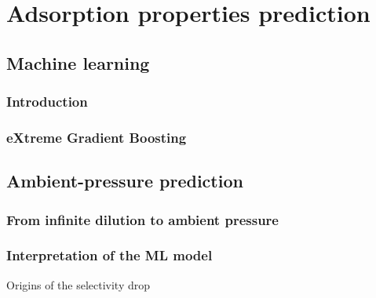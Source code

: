 \documentclass[main]{subfiles}
\begin{document}
\chapter{Adsorption properties prediction}
\vspace*{-1\baselineskip}

\section{Machine learning}

\subsection{Introduction}

\subsection{eXtreme Gradient Boosting}

\section{Ambient-pressure prediction}

\subsection{From infinite dilution to ambient pressure}

\subsection{Interpretation of the ML model}

Origins of the selectivity drop

\OnlyInSubfile{\printglobalbibliography}
\end{document}
